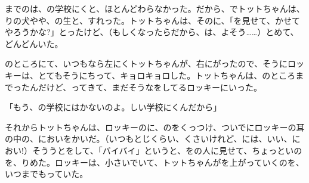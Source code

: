 までのは、の学校にくと、ほとんどわらなかった。だから、でトットちゃんは、りの犬やや、の生と、すれった。トットちゃんは、そのに、「を見せて、かせてやろうかな?」とったけど、（もしくなったらだから、は、よそう……）とめて、どんどんいた。

のところにて、いつもなら左にくトットちゃんが、右にがったので、そうにロッキーは、とてもそうにちって、キョロキョロした。トットちゃんは、のところまでったんだけど、ってきて、まだそうなをしてるロッキーにいった。

「もう、の学校にはかないのよ。しい学校にくんだから」

それからトットちゃんは、ロッキーのに、のをくっつけ、ついでにロッキーの耳の中の、においをかいだ。（いつもとじくらい、くさいけれど、には、いい、におい!）そううとをして、「バイバイ」というと、をの人に見せて、ちょっといのを、りめた。ロッキーは、小さいでいて、トットちゃんがを上がっていくのを、いつまでもっていた。




